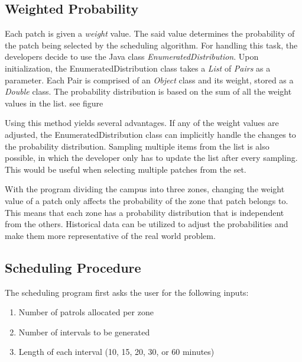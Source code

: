 \documentclass[journal]{./IEEE/IEEEtran}
\begin{document}
\subsection{Weighted Probability}
Each patch is given a \textit{weight} value. The said value determines the probability of the patch being selected by the scheduling algorithm. For handling this task, the developers decide to use the Java class \textit{EnumeratedDistribution}. Upon initialization, the EnumeratedDistribution class takes a \textit{List} of \textit{Pairs} as a parameter. Each Pair is comprised of an \textit{Object} class and its weight, stored as a \textit{Double} class. The probability distribution is based on the sum of all the weight values in the list. see figure

Using this method yields several advantages. If any of the weight values are adjusted, the EnumeratedDistribution class can implicitly handle the changes to the probability distribution. Sampling multiple items from the list is also possible, in which the developer only has to update the list after every sampling. This would be useful when selecting multiple patches from the set.

With the program dividing the campus into three zones, changing the weight value of a patch only affects the probability of the zone that patch belongs to. This means that each zone has a probability distribution that is independent from the others. Historical data can be utilized to adjust the probabilities and make them more representative of the real world problem.


\subsection{Scheduling Procedure}
The scheduling program first asks the user for the following inputs:

\begin{enumerate}
\item{Number of patrols allocated per zone}
\item{Number of intervals to be generated}
\item{Length of each interval (10, 15, 20, 30, or 60 minutes)}
\end{enumerate}
\end{document}
